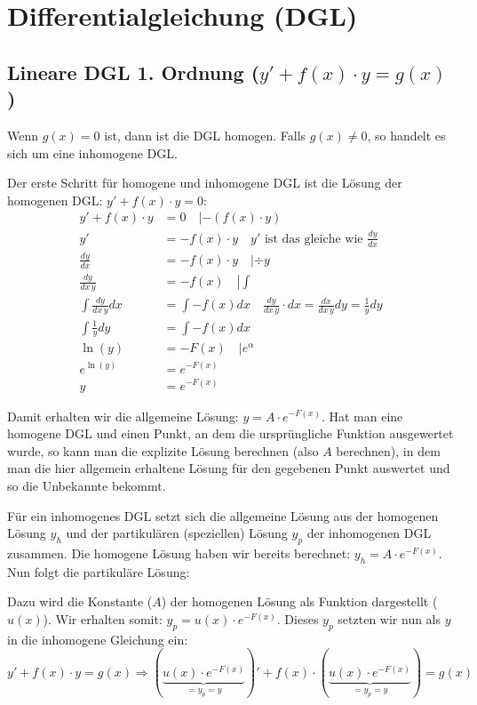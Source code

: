 \section{Differentialgleichung (DGL)}
\subsection{Lineare DGL 1. Ordnung ($y' + f(x) \cdot y = g(x)$)}
Wenn $g(x) = 0$ ist, dann ist die DGL homogen. Falls $g(x) \neq 0$, so handelt
es sich um eine inhomogene DGL.

Der erste Schritt für homogene und inhomogene DGL ist die Lösung der homogenen
DGL: $y' + f(x) \cdot y = 0$:
{\small
\begin{align*}
y' + f(x) \cdot y &= 0 \quad \left | -(f(x) \cdot y) \right.\\
y' &= -f(x) \cdot y \quad \boxed{y' \text{ ist das gleiche wie } \frac{dy}{dx}}\\
\frac{dy}{dx} &= -f(x) \cdot y \quad \left | \div y \right.\\
\frac{dy}{dx\, y} &= -f(x) \quad \left | \int \right.\\
\int \frac{dy}{dx\, y} dx &= \int -f(x) dx \quad \boxed{\frac{dy}{dx\, y} \cdot dx = \frac{dx}{dx\, y} dy = \frac{1}{y} dy}\\
\int \frac{1}{y} dy &= \int -f(x) dx\\
\ln(y) &= -F(x) \quad \left | e^\alpha \right.\\
e^{\ln(y)} &= e^{-F(x)}\\
y &= e^{-F(x)}
\end{align*}
}

Damit erhalten wir die allgemeine Lösung: $y = A \cdot e^{-F(x)}$. Hat man eine
homogene DGL und einen Punkt, an dem die ursprüngliche Funktion ausgewertet wurde,
so kann man die explizite Lösung berechnen (also $A$ berechnen), in dem man die
hier allgemein erhaltene Lösung für den gegebenen Punkt auswertet und so die
Unbekannte bekommt.

Für ein inhomogenes DGL setzt sich die allgemeine Lösung aus der homogenen Lösung
$y_h$ und der partikulären (speziellen) Lösung $y_p$ der inhomogenen DGL zusammen.
Die homogene Lösung haben wir bereits berechnet: $y_h = A \cdot e^{-F(x)}$. Nun
folgt die partikuläre Lösung:

Dazu wird die Konstante ($A$) der homogenen Lösung als Funktion dargestellt ($u(x)$).
Wir erhalten somit: $y_p = u(x) \cdot e^{-F(x)}$.
Dieses $y_p$ setzten wir nun als $y$ in die inhomogene Gleichung ein:
{\small
\[
y' + f(x) \cdot y = g(x) \Rightarrow (\underbrace{u(x) \cdot e^{-F(x)}}_{= y_p = y})'
+ f(x) \cdot (\underbrace{u(x) \cdot e^{-F(x)}}_{= y_p = y}) = g(x)
\]
}

